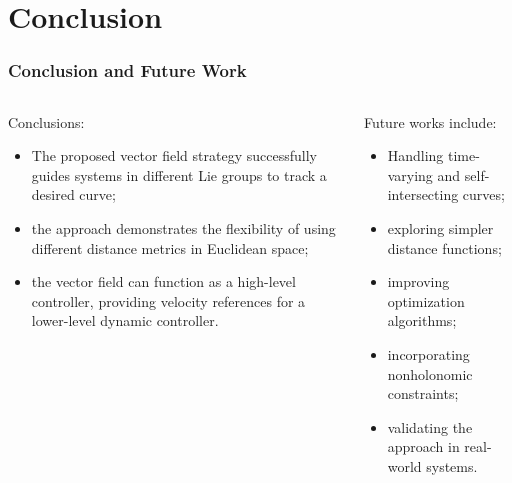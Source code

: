 \section{Conclusion}

\begin{frame}

    \frametitle{Conclusion and Future Work}
    \begin{columns}[c]
        \begin{column}{0.5\linewidth}
            Conclusions:
            \begin{itemize}
                \item The proposed vector field strategy successfully guides systems in different Lie groups to track a desired curve;
                \item the approach demonstrates the flexibility of using different distance metrics in Euclidean space;
                \item the vector field can function as a high-level controller, providing velocity references for a lower-level dynamic controller.
            \end{itemize}
        \end{column}
        \begin{column}{0.5\linewidth}
            Future works include:
            \begin{itemize}
                \item Handling time-varying and self-intersecting curves;
                \item exploring simpler distance functions;
                \item improving optimization algorithms;
                \item incorporating nonholonomic constraints;
                \item validating the approach in real-world systems.
            \end{itemize}
        \end{column}
        
    \end{columns}
\end{frame}

